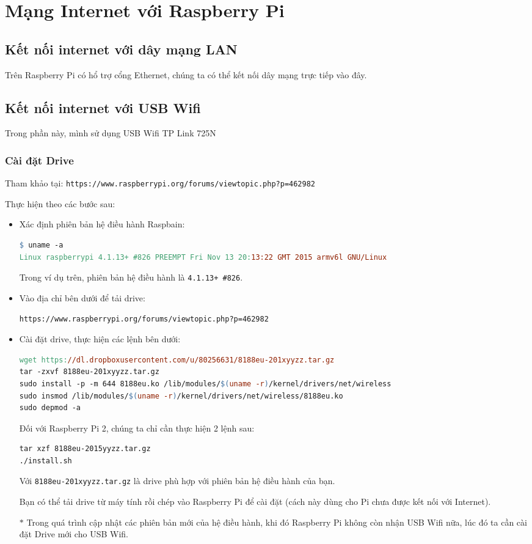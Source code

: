 \chapter{Mạng Internet với Raspberry Pi}
\section{Kết nối internet với dây mạng LAN}
Trên Raspberry Pi có hổ trợ cổng Ethernet, chúng ta có thể kết nối dây mạng trực tiếp vào đây.
\section{Kết nối internet với USB Wifi}
Trong phần này, mình sử dụng USB Wifi TP Link 725N
\subsection{Cài đặt Drive}
Tham khảo tại: \verb|https://www.raspberrypi.org/forums/viewtopic.php?p=462982|

Thực hiện theo các bước sau:
\begin{itemize}
\item Xác định phiên bản hệ điều hành Raspbain:
\begin{lstlisting}[language=make]
$ uname -a
Linux raspberrypi 4.1.13+ #826 PREEMPT Fri Nov 13 20:13:22 GMT 2015 armv6l GNU/Linux
\end{lstlisting}
Trong ví dụ trên, phiên bản hệ điều hành là \verb|4.1.13+ #826|. 
\item Vào địa chỉ bên dưới để tải drive:

\verb|https://www.raspberrypi.org/forums/viewtopic.php?p=462982|
\item Cài đặt drive, thực hiện các lệnh bên dưới:
\begin{lstlisting}[language=make]
wget https://dl.dropboxusercontent.com/u/80256631/8188eu-201xyyzz.tar.gz
tar -zxvf 8188eu-201xyyzz.tar.gz
sudo install -p -m 644 8188eu.ko /lib/modules/$(uname -r)/kernel/drivers/net/wireless
sudo insmod /lib/modules/$(uname -r)/kernel/drivers/net/wireless/8188eu.ko
sudo depmod -a
\end{lstlisting}
Đối với Raspberry Pi 2, chúng ta chỉ cần thực hiện 2 lệnh sau:
\begin{lstlisting}[language=make]
tar xzf 8188eu-2015yyzz.tar.gz
./install.sh
\end{lstlisting}
Với \verb|8188eu-201xyyzz.tar.gz| là drive phù hợp với phiên bản hệ điều hành của bạn.

Bạn có thể tải drive từ máy tính rồi chép vào Raspberry Pi để cài đặt (cách này dùng cho Pi chưa được kết nối với Internet).
\item[$\ast$] Trong quá trình cập nhật các phiên bản mới của hệ điều hành, khi đó Raspberry Pi không còn nhận USB Wifi nữa, lúc đó ta cần cài đặt Drive mới cho USB Wifi.
\end{itemize}
